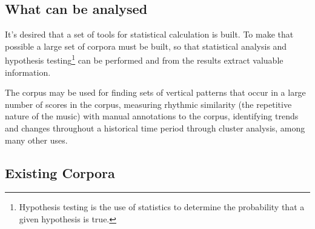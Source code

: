 \subsection{What can be analysed} 

It's desired that a set of tools for statistical calculation is built. To make that possible a large
set of corpora must be built, so that statistical analysis and hypothesis
testing\footnote{Hypothesis testing is the use of statistics to determine the probability that a
given hypothesis is true.} can be performed and from the results extract valuable information.

The corpus may be used for finding sets of vertical patterns that occur in a large number of scores
in the corpus\cite{Conklin2002}, measuring rhythmic similarity (the repetitive nature of the music)
with manual annotations to the corpus\cite{antonopoulos2007music}, identifying trends and changes
throughout a historical time period through cluster analysis\cite{albrechtemergence}, among many
other uses.

% 

\subsection{Existing Corpora} 

